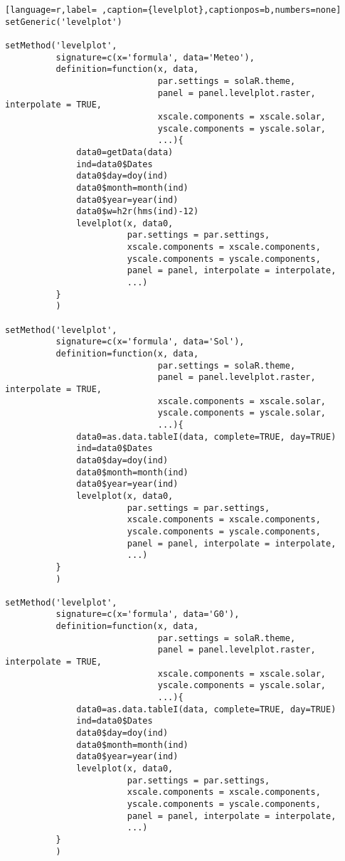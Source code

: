 \begin{lstlisting}[language=r,label= ,caption={levelplot},captionpos=b,numbers=none]
setGeneric('levelplot')

setMethod('levelplot',
          signature=c(x='formula', data='Meteo'),
          definition=function(x, data,
                              par.settings = solaR.theme,
                              panel = panel.levelplot.raster, interpolate = TRUE,
                              xscale.components = xscale.solar,
                              yscale.components = yscale.solar,
                              ...){
              data0=getData(data)
              ind=data0$Dates
              data0$day=doy(ind)
              data0$month=month(ind)
              data0$year=year(ind)
              data0$w=h2r(hms(ind)-12)
              levelplot(x, data0,
                        par.settings = par.settings,
                        xscale.components = xscale.components,
                        yscale.components = yscale.components,
                        panel = panel, interpolate = interpolate,
                        ...)
          }
          )

setMethod('levelplot',
          signature=c(x='formula', data='Sol'),
          definition=function(x, data,
                              par.settings = solaR.theme,
                              panel = panel.levelplot.raster, interpolate = TRUE,
                              xscale.components = xscale.solar,
                              yscale.components = yscale.solar,
                              ...){
              data0=as.data.tableI(data, complete=TRUE, day=TRUE)
              ind=data0$Dates
              data0$day=doy(ind)
              data0$month=month(ind)
              data0$year=year(ind)
              levelplot(x, data0,
                        par.settings = par.settings,
                        xscale.components = xscale.components,
                        yscale.components = yscale.components,
                        panel = panel, interpolate = interpolate,
                        ...)
          }
          )

setMethod('levelplot',
          signature=c(x='formula', data='G0'),
          definition=function(x, data,
                              par.settings = solaR.theme,
                              panel = panel.levelplot.raster, interpolate = TRUE,
                              xscale.components = xscale.solar,
                              yscale.components = yscale.solar,
                              ...){
              data0=as.data.tableI(data, complete=TRUE, day=TRUE)
              ind=data0$Dates
              data0$day=doy(ind)
              data0$month=month(ind)
              data0$year=year(ind)
              levelplot(x, data0, 
                        par.settings = par.settings,
                        xscale.components = xscale.components,
                        yscale.components = yscale.components,
                        panel = panel, interpolate = interpolate,
                        ...)
          }
          )
\end{lstlisting}
